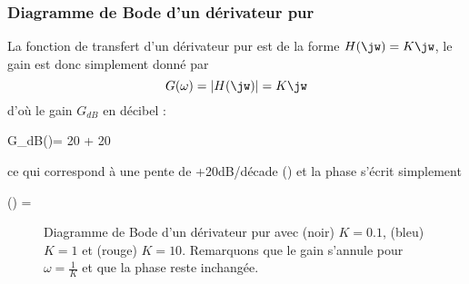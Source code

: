 \subsubsection{Diagramme de Bode d'un dérivateur pur}
La fonction de transfert d'un dérivateur pur est de la forme $H(\jw)=K\jw$,
le gain est donc simplement donné par 
\[
G(\omega)=|H(\jw)|=K\jw
\] 
d'où le gain $G_{dB}$ en décibel :
\begin{bequation}
    G_{dB}(\omega)= 20 + 20\log{\omega}
\end{bequation}
ce qui correspond à une pente de +20dB/décade () et
la phase s'écrit simplement 
\begin{bequation}
    \phi(\omega) = 
\end{bequation}
\begin{figure}[!htb]
    \centering
    

    
    \caption{Diagramme de Bode d'un dérivateur pur 
             avec (noir) $K=0.1$, (bleu) $K=1$ et (rouge) $K=10$. Remarquons 
             que le gain s'annule pour $\omega=\frac{1}{K}$ et que la phase 
             reste inchangée.\label{fig-bode_deriv}}
\end{figure}
\newpage

